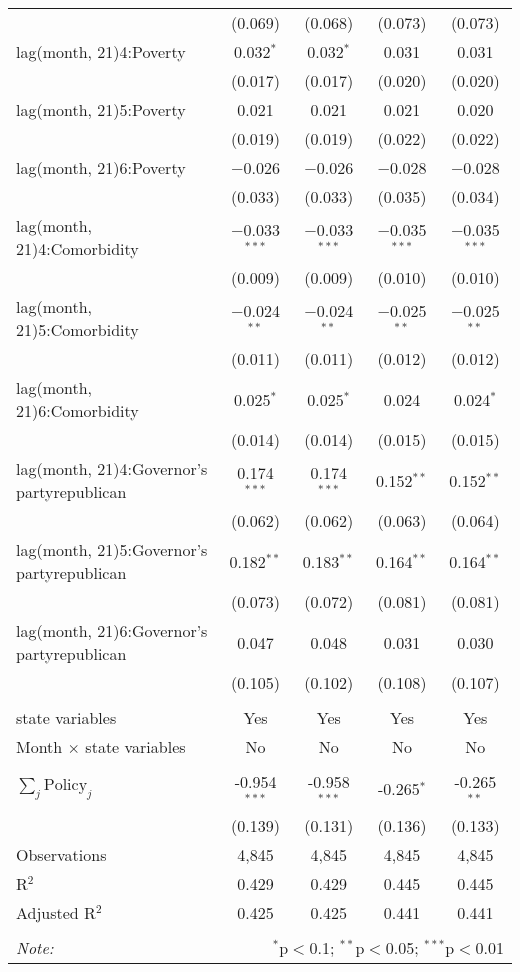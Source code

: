 \begin{tabular}{@{\extracolsep{1pt}}lcccc}
  & (0.069) & (0.068) & (0.073) & (0.073) \\ 
  lag(month, 21)4:Poverty & 0.032$^{*}$ & 0.032$^{*}$ & 0.031 & 0.031 \\ 
  & (0.017) & (0.017) & (0.020) & (0.020) \\ 
  lag(month, 21)5:Poverty & 0.021 & 0.021 & 0.021 & 0.020 \\ 
  & (0.019) & (0.019) & (0.022) & (0.022) \\ 
  lag(month, 21)6:Poverty & $-$0.026 & $-$0.026 & $-$0.028 & $-$0.028 \\ 
  & (0.033) & (0.033) & (0.035) & (0.034) \\ 
  lag(month, 21)4:Comorbidity & $-$0.033$^{***}$ & $-$0.033$^{***}$ & $-$0.035$^{***}$ & $-$0.035$^{***}$ \\ 
  & (0.009) & (0.009) & (0.010) & (0.010) \\ 
  lag(month, 21)5:Comorbidity & $-$0.024$^{**}$ & $-$0.024$^{**}$ & $-$0.025$^{**}$ & $-$0.025$^{**}$ \\ 
  & (0.011) & (0.011) & (0.012) & (0.012) \\ 
  lag(month, 21)6:Comorbidity & 0.025$^{*}$ & 0.025$^{*}$ & 0.024 & 0.024$^{*}$ \\ 
  & (0.014) & (0.014) & (0.015) & (0.015) \\ 
  lag(month, 21)4:Governor's partyrepublican & 0.174$^{***}$ & 0.174$^{***}$ & 0.152$^{**}$ & 0.152$^{**}$ \\ 
  & (0.062) & (0.062) & (0.063) & (0.064) \\ 
  lag(month, 21)5:Governor's partyrepublican & 0.182$^{**}$ & 0.183$^{**}$ & 0.164$^{**}$ & 0.164$^{**}$ \\ 
  & (0.073) & (0.072) & (0.081) & (0.081) \\ 
  lag(month, 21)6:Governor's partyrepublican & 0.047 & 0.048 & 0.031 & 0.030 \\ 
  & (0.105) & (0.102) & (0.108) & (0.107) \\ 
 \hline \\[-1.8ex] 
state variables & Yes & Yes & Yes & Yes \\ 
Month $\times$ state variables & No & No & No & No \\ 
\hline \\[-1.8ex] 
$\sum_j \mathrm{Policy}_j$ & -0.954$^{***}$ & -0.958$^{***}$ & -0.265$^{*}$ & -0.265$^{**}$ \\ 
 & (0.139) & (0.131) & (0.136) & (0.133) \\ 
Observations & 4,845 & 4,845 & 4,845 & 4,845 \\ 
R$^{2}$ & 0.429 & 0.429 & 0.445 & 0.445 \\ 
Adjusted R$^{2}$ & 0.425 & 0.425 & 0.441 & 0.441 \\ 
\hline 
\hline \\[-1.8ex] 
\textit{Note:}  & \multicolumn{4}{r}{$^{*}$p$<$0.1; $^{**}$p$<$0.05; $^{***}$p$<$0.01} \\ 
\end{tabular} 